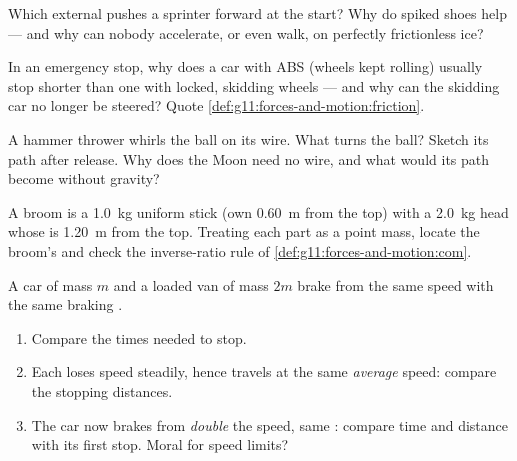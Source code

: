 \begin{exercise}[$\star\star$]\label{exo:g11:forces-and-motion:9}
Which external  pushes a sprinter forward at the start? Why do
spiked shoes help --- and why can nobody accelerate, or even walk, on
perfectly frictionless ice?
\end{exercise}

\begin{exercise}[$\star\star$]\label{exo:g11:forces-and-motion:10}
In an emergency stop, why does a car with ABS (wheels kept rolling)
usually stop shorter than one with locked, skidding wheels --- and why
can the skidding car no longer be steered? Quote
\cref{def:g11:forces-and-motion:friction}.
\end{exercise}

\begin{exercise}[$\star\star$]\label{exo:g11:forces-and-motion:11}
A hammer thrower whirls the ball on its wire. What  turns the
ball? Sketch its path after release. Why does the Moon need no wire,
and what would its path become without gravity?
\end{exercise}

\begin{exercise}[$\star\star\star$]\label{exo:g11:forces-and-motion:12}
A broom is a \qty{1.0}{kg} uniform stick (own 
\qty{0.60}{m} from the top) with a \qty{2.0}{kg} head whose  is \qty{1.20}{m} from the top. Treating each part as a point mass,
locate the broom's  and check the inverse-ratio rule of
\cref{def:g11:forces-and-motion:com}.
\end{exercise}

\begin{exercise}[$\star\star\star$]\label{exo:g11:forces-and-motion:13}
A car of mass $m$ and a loaded van of mass $2m$ brake from the same
speed with the same braking .
\begin{enumerate}
  \item Compare the times needed to stop.
  \item Each loses speed steadily, hence travels at the same
        \emph{average} speed: compare the stopping distances.
  \item The car now brakes from \emph{double} the speed, same :
        compare time and distance with its first stop. Moral for speed limits?
\end{enumerate}
\end{exercise}

